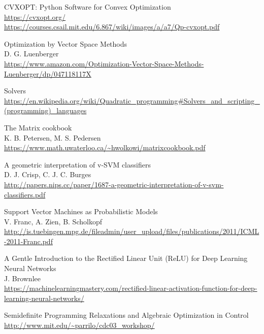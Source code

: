 \documentclass{article}
\begin{document}
\begin{thebibliography}{1}
        CVXOPT: Python Software for Convex Optimization
        \\
        \url{https://cvxopt.org/}
        \\
        \url{https://courses.csail.mit.edu/6.867/wiki/images/a/a7/Qp-cvxopt.pdf}

        Optimization by Vector Space Methods
        \\
        D. G. Luenberger
        \\
        \url{https://www.amazon.com/Optimization-Vector-Space-Methods-Luenberger/dp/047118117X}
    
        Solvers
        \\
        \url{https://en.wikipedia.org/wiki/Quadratic_programming#Solvers_and_scripting_(programming)_languages}

        The Matrix cookbook
        \\
        K. B. Petersen, M. S. Pedersen
        \\
        \url{https://www.math.uwaterloo.ca/~hwolkowi/matrixcookbook.pdf}

        A geometric interpretation of v-SVM classifiers
        \\
        D. J. Crisp, C. J. C. Burges
        \\
        \url{http://papers.nips.cc/paper/1687-a-geometric-interpretation-of-v-svm-classifiers.pdf}
    
        Support Vector Machines as Probabilistic Models
        \\
        V. Franc, A. Zien, B. Scholkopf
        \\
        \url{http://is.tuebingen.mpg.de/fileadmin/user_upload/files/publications/2011/ICML-2011-Franc.pdf}
    
        A Gentle Introduction to the Rectified Linear Unit (ReLU) for Deep Learning Neural Networks
        \\
        J. Brownlee
        \\
        \url{https://machinelearningmastery.com/rectified-linear-activation-function-for-deep-learning-neural-networks/}

        Semidefinite Programming Relaxations and Algebraic Optimization in Control
        \\
        \url{http://www.mit.edu/~parrilo/cdc03_workshop/}


\end{thebibliography}
\end{document}
